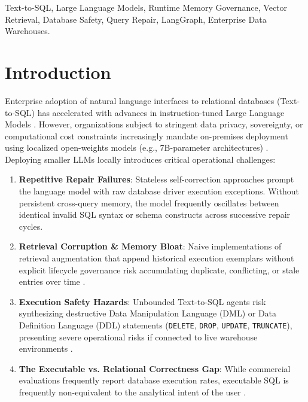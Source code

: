 \documentclass[conference]{IEEEtran}
\begin{document}
\begin{IEEEkeywords}
Text-to-SQL, Large Language Models, Runtime Memory Governance, Vector Retrieval, Database Safety, Query Repair, LangGraph, Enterprise Data Warehouses.
\end{IEEEkeywords}

\section{Introduction}
Enterprise adoption of natural language interfaces to relational databases (Text-to-SQL) has accelerated with advances in instruction-tuned Large Language Models \cite{pourreza2023dinsql, gao2024dailsql}. However, organizations subject to stringent data privacy, sovereignty, or computational cost constraints increasingly mandate on-premises deployment using localized open-weights models (e.g., 7B-parameter architectures) \cite{qwen2024qwen25}. Deploying smaller LLMs locally introduces critical operational challenges:
\begin{enumerate}
    \item \textbf{Repetitive Repair Failures}: Stateless self-correction approaches \cite{madaan2023selfrefine, shinn2023reflexion} prompt the language model with raw database driver execution exceptions. Without persistent cross-query memory, the model frequently oscillates between identical invalid SQL syntax or schema constructs across successive repair cycles.
    \item \textbf{Retrieval Corruption \& Memory Bloat}: Naive implementations of retrieval augmentation \cite{lewis2020rag} that append historical execution exemplars without explicit lifecycle governance risk accumulating duplicate, conflicting, or stale entries over time \cite{park2023generativeagents, packer2023memgpt}.
    \item \textbf{Execution Safety Hazards}: Unbounded Text-to-SQL agents risk synthesizing destructive Data Manipulation Language (DML) or Data Definition Language (DDL) statements (\texttt{DELETE}, \texttt{DROP}, \texttt{UPDATE}, \texttt{TRUNCATE}), presenting severe operational risks if connected to live warehouse environments \cite{rebedea2023nemoguardrails, mao2023sqlglot, halfond2005amnesia}.
    \item \textbf{The Executable vs. Relational Correctness Gap}: While commercial evaluations frequently report database execution rates, executable SQL is frequently non-equivalent to the analytical intent of the user \cite{finegandollak2018eval, zhong2020distilled}.
\end{enumerate}
\end{document}
